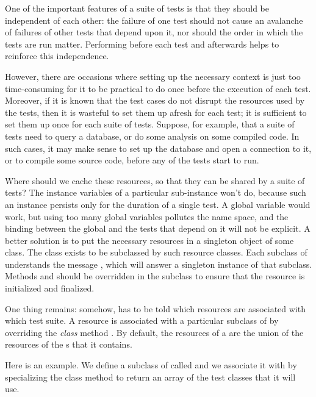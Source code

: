\documentclass[a4paper,10pt,twoside]{book}
\begin{document}
One of the important  features of a suite of tests is that they should be independent of each other: the failure of one test should not cause an avalanche of failures of other tests that depend upon it, nor should the order in which the tests are run matter.
Performing  before each test and  afterwards helps to reinforce this independence. 

However, there are occasions where setting up the necessary context is just too time-consuming for it to be practical to do once before the execution of each test.
Moreover, if it is known that the test cases do not disrupt the resources used by the tests, then it is wasteful to set them up afresh for each test; it is sufficient to set them up once for each suite of tests.
Suppose, for example, that a suite of tests need to query a database, or do some analysis on some compiled code.
In such cases, it may make sense to set up the database and open a connection to it, or to compile some source code, before any of the tests start to run.

Where should we cache these resources, so that they can be shared by a suite of tests?
The instance variables of a particular  sub-instance won't do, because such an instance persists only for the duration of a single test.
A global variable would work, but using too many global variables pollutes the name space, and the binding between the global and the tests that depend on it will not be explicit.
A better solution is to put the necessary resources in a singleton object of some class.
The class  exists to be subclassed by such resource classes.
Each subclass of  understands the message  , which will answer a singleton instance of that subclass.
Methods  and  should be overridden in the subclass to ensure that the resource is initialized and finalized.

One thing remains: somehow, \sunit has to be told which resources are associated with which test suite.
A resource is associated
with a particular subclass of  
by overriding the \emph{class} method .
By default, the resources of 
a  are
the union of the resources of
the s that it contains.

Here is an example. 
We define a subclass of  called
 and we associate it with 
by specializing the class method  to return an array
of the test classes that it will use.
\end{document}
